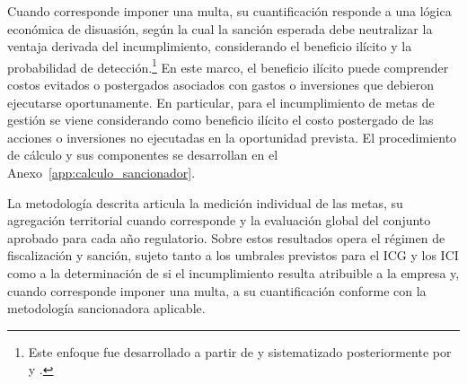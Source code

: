 Cuando corresponde imponer una multa, su cuantificación responde a una lógica económica de disuasión, según la cual la sanción esperada debe neutralizar la ventaja derivada del incumplimiento, considerando el beneficio ilícito y la probabilidad de detección.\footnote{Este enfoque fue desarrollado a partir de \citet{becker1968crime} y sistematizado posteriormente por \citet{stigler1970optimum} y \citet{polinsky2000economic,polinsky2007theory}.} En este marco, el beneficio ilícito puede comprender costos evitados o postergados asociados con gastos o inversiones que debieron ejecutarse oportunamente. En particular, para el incumplimiento de metas de gestión se viene considerando como beneficio ilícito el costo postergado de las acciones o inversiones no ejecutadas en la oportunidad prevista. El procedimiento de cálculo y sus componentes se desarrollan en el Anexo~\ref{app:calculo_sancionador}.
 
La metodología descrita articula la medición individual de las metas, su agregación territorial cuando corresponde y la evaluación global del conjunto aprobado para cada año regulatorio. Sobre estos resultados opera el régimen de fiscalización y sanción, sujeto tanto a los umbrales previstos para el ICG y los ICI como a la determinación de si el incumplimiento resulta atribuible a la empresa y, cuando corresponde imponer una multa, a su cuantificación conforme con la metodología sancionadora aplicable.